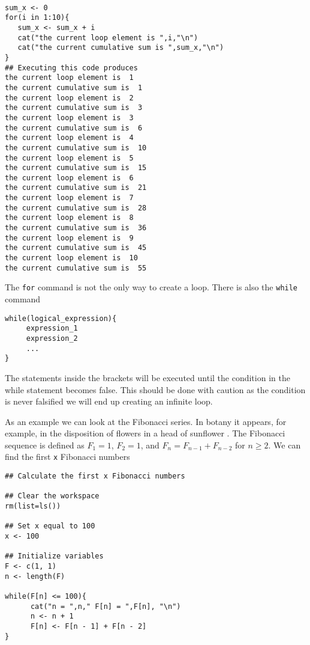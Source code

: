 \begin{lstlisting}

sum_x <- 0
for(i in 1:10){
   sum_x <- sum_x + i
   cat("the current loop element is ",i,"\n")
   cat("the current cumulative sum is ",sum_x,"\n")
}
## Executing this code produces
the current loop element is  1 
the current cumulative sum is  1 
the current loop element is  2 
the current cumulative sum is  3 
the current loop element is  3 
the current cumulative sum is  6 
the current loop element is  4 
the current cumulative sum is  10 
the current loop element is  5 
the current cumulative sum is  15 
the current loop element is  6 
the current cumulative sum is  21 
the current loop element is  7 
the current cumulative sum is  28 
the current loop element is  8 
the current cumulative sum is  36 
the current loop element is  9 
the current cumulative sum is  45 
the current loop element is  10 
the current cumulative sum is  55 
\end{lstlisting}

The \texttt{for} command is not the only way to create a loop. There
is also the \texttt{while} command

\begin{lstlisting}
while(logical_expression){
     expression_1
     expression_2
     ...
}
\end{lstlisting}

The statements inside the brackets will be executed until the
condition in the while statement becomes false. This should be done
with caution as the condition is never falsified we will end up
creating an infinite loop.

As an example we can look at the Fibonacci series. In botany it
appears, for example, in the disposition of flowers in a head of
sunflower \citep{Thornley:2000}. The Fibonacci sequence is defined as
$F_1 = 1$, $F_2 = 1$, and $F_n = F_{n-1} + F_{n-2}$ for $n \geq 2$. We
can find the first \texttt{x} Fibonacci numbers

\begin{lstlisting}
## Calculate the first x Fibonacci numbers

## Clear the workspace
rm(list=ls())

## Set x equal to 100
x <- 100

## Initialize variables
F <- c(1, 1)
n <- length(F)

while(F[n] <= 100){
      cat("n = ",n," F[n] = ",F[n], "\n")
      n <- n + 1
      F[n] <- F[n - 1] + F[n - 2]
}
\end{lstlisting}

